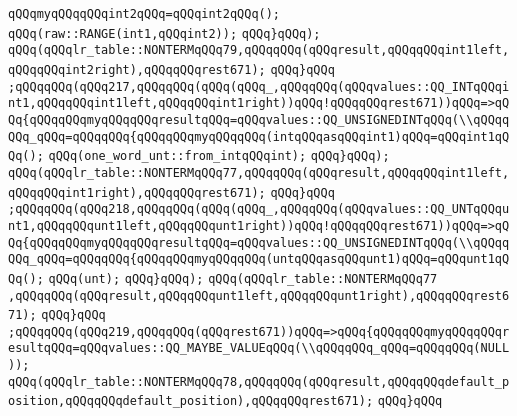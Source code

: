 \newline
\verb|qQQqmyqQQqqQQqint2qQQq=qQQqint2qQQq();|\newline
\verb|qQQq(raw::RANGE(int1,qQQqint2));|\newline
\verb|qQQq}qQQq);|\newline
\verb|qQQq(qQQqlr_table::NONTERMqQQq79,qQQqqQQq(qQQqresult,qQQqqQQqint1left,qQQqqQQqint2right),qQQqqQQqrest671);|\newline
\verb|qQQq}qQQq|\newline
\verb|;qQQqqQQq(qQQq217,qQQqqQQq(qQQq(qQQq_,qQQqqQQq(qQQqvalues::QQ_INTqQQqint1,qQQqqQQqint1left,qQQqqQQqint1right))qQQq!qQQqqQQqrest671))qQQq=>qQQq{qQQqqQQqmyqQQqqQQqresultqQQq=qQQqvalues::QQ_UNSIGNEDINTqQQq(\\qQQqqQQq_qQQq=qQQqqQQq{qQQqqQQqmyqQQqqQQq(intqQQqasqQQqint1)qQQq=qQQqint1qQQq();|\newline
\verb|qQQq(one_word_unt::from_intqQQqint);|\newline
\verb|qQQq}qQQq);|\newline
\newline
\verb|qQQq(qQQqlr_table::NONTERMqQQq77,qQQqqQQq(qQQqresult,qQQqqQQqint1left,qQQqqQQqint1right),qQQqqQQqrest671);|\newline
\verb|qQQq}qQQq|\newline
\verb|;qQQqqQQq(qQQq218,qQQqqQQq(qQQq(qQQq_,qQQqqQQq(qQQqvalues::QQ_UNTqQQqunt1,qQQqqQQqunt1left,qQQqqQQqunt1right))qQQq!qQQqqQQqrest671))qQQq=>qQQq{qQQqqQQqmyqQQqqQQqresultqQQq=qQQqvalues::QQ_UNSIGNEDINTqQQq(\\qQQqqQQq_qQQq=qQQqqQQq{qQQqqQQqmyqQQqqQQq(untqQQqasqQQqunt1)qQQq=qQQqunt1qQQq();|\newline
\verb|qQQq(unt);|\newline
\verb|qQQq}qQQq);|\newline
\verb|qQQq(qQQqlr_table::NONTERMqQQq77|\newline
\verb|,qQQqqQQq(qQQqresult,qQQqqQQqunt1left,qQQqqQQqunt1right),qQQqqQQqrest671);|\newline
\verb|qQQq}qQQq|\newline
\verb|;qQQqqQQq(qQQq219,qQQqqQQq(qQQqrest671))qQQq=>qQQq{qQQqqQQqmyqQQqqQQqresultqQQq=qQQqvalues::QQ_MAYBE_VALUEqQQq(\\qQQqqQQq_qQQq=qQQqqQQq(NULL));|\newline
\verb|qQQq(qQQqlr_table::NONTERMqQQq78,qQQqqQQq(qQQqresult,qQQqqQQqdefault_position,qQQqqQQqdefault_position),qQQqqQQqrest671);|\newline
\verb|qQQq}qQQq|\newline
